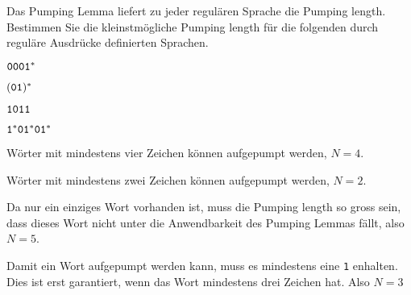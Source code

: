 Das Pumping Lemma liefert zu jeder regulären Sprache die Pumping length.
Bestimmen Sie die kleinstmögliche Pumping length für die folgenden
durch reguläre Ausdrücke definierten Sprachen.
\begin{teilaufgaben}
\item ${\tt 0001}^*$
\item $({\tt 01})^*$
\item ${\tt 1011}$
\item ${\tt 1}^*{\tt 01}^*{\tt 01}^*$
\end{teilaufgaben}

\begin{loesung}
\begin{teilaufgaben}
\item Wörter mit mindestens vier Zeichen können aufgepumpt werden,
$N=4$.
\item Wörter mit mindestens zwei Zeichen können aufgepumpt werden,
$N=2$.
\item Da nur ein einziges Wort vorhanden ist, muss die Pumping length
so gross sein, dass dieses Wort nicht unter die Anwendbarkeit des
Pumping Lemmas fällt, also $N=5$.
\item Damit ein Wort aufgepumpt werden kann, muss es mindestens eine
{\tt 1} enhalten. Dies ist erst garantiert, wenn das Wort  mindestens
drei Zeichen hat. Also $N=3$
\qedhere
\end{teilaufgaben}
\end{loesung}
